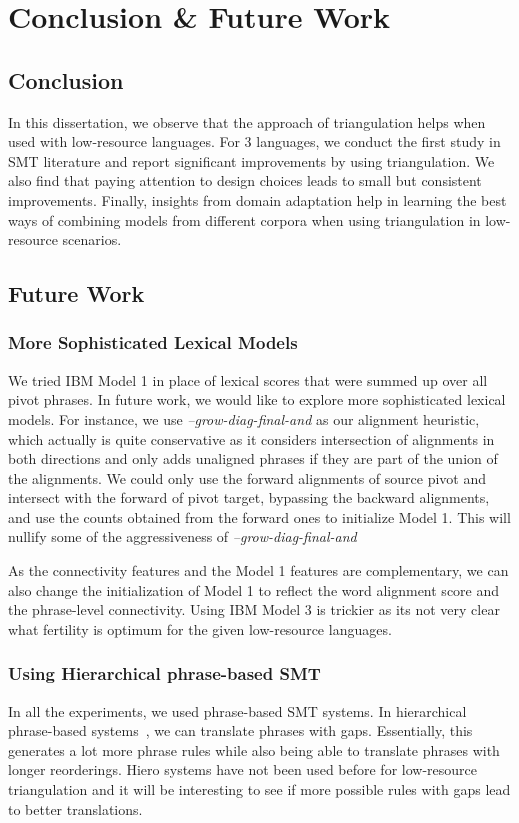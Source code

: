 \chapter{Conclusion \& Future Work}
\label{chap:conclusion}

\section{Conclusion}
	In this dissertation, we observe that the approach of triangulation helps when used with low-resource languages. For 3 languages, we conduct the first study in SMT literature and report significant improvements by using triangulation. We also find that paying attention to design choices leads to small but consistent improvements. Finally, insights from domain adaptation help in learning the best ways of combining models from different corpora when using triangulation in low-resource scenarios. 
\section{Future Work}
\subsection{More Sophisticated Lexical Models}
	We tried IBM Model 1 in place of lexical scores that were summed up over all pivot phrases. In future work, we would like to explore more sophisticated lexical models. For instance, we use \emph{--grow-diag-final-and} as our alignment heuristic, which actually is quite conservative as it considers intersection of alignments in both directions and only adds unaligned phrases if they are part of the union of the alignments. We could only use the forward alignments of source pivot and intersect with the forward of pivot target, bypassing the backward alignments, and use the counts obtained from the forward ones to initialize Model 1. This will nullify some of the aggressiveness of \emph{--grow-diag-final-and} 

	As the connectivity features and the Model 1 features are complementary, we can also change the initialization of Model 1 to reflect the word alignment score and the phrase-level connectivity. Using IBM Model 3 is trickier as its not very clear what fertility is optimum for the given low-resource languages. 


\subsection{Using Hierarchical phrase-based SMT}
	In all the experiments, we used phrase-based SMT systems. In hierarchical phrase-based systems~\cite{Chiang:07}, we can translate phrases with gaps. Essentially, this generates a lot more phrase rules while also being able to translate phrases with longer reorderings. Hiero systems have not been used before for low-resource triangulation and it will be interesting to see if more possible rules with gaps lead to better translations. 

